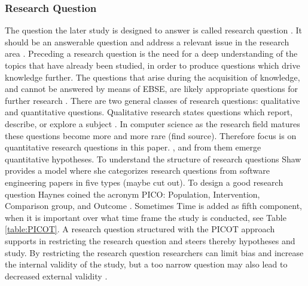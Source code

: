 \subsubsection{Research Question}

The question the later study is designed to answer is called research question \cite{Vickers}. It should be an answerable question and address a relevant issue in the research area \cite{Dyba2005}. Preceding a research question is the need for a deep understanding of the topics that have already been studied, in order to produce questions which drive knowledge further. The questions that arise during the acquisition of knowledge, and cannot be answered by means of EBSE, are likely appropriate questions for further research \cite{Farrugia2009}. \newline
There are two general classes of research questions: qualitative and quantitative questions. Qualitative research states questions which report, describe, or explore a subject \cite[p. 139-141]{Creswell2014}. In computer science as the research field matures these questions become more and more rare {\color{red} (find source)}. Therefore focus is on quantitative research questions in this paper.  \cite[p. 143]{Creswell2014}, and from them emerge quantitative hypotheses. \newline
To understand the structure of research questions Shaw provides a model where she categorizes research questions from software engineering papers in five types \cite{Shaw2002} {\color{red} (maybe cut out)}. \newline
To design a good research question Haynes coined the acronym PICO: Population, Intervention, Comparison group, and Outcome \cite{BrianHaynes2006}. Sometimes Time is added as fifth component, when it is important over what time frame the study is conducted, see Table \ref{table:PICOT}. A research question structured with the PICOT approach supports in restricting the research question and steers thereby hypotheses and study. By restricting the research question researchers can limit bias and increase the internal validity of the study, but a too narrow question may also lead to decreased external validity \cite{Farrugia2009}. \\
